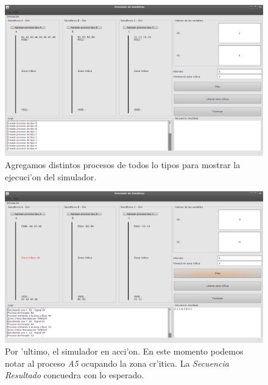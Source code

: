 \begin{figure}
\centering
 \includegraphics[scale=0.4,keepaspectratio=true]{./imagenes/semaforo/semaforos5.png}
 \caption{Agregamos distintos procesos de todos lo tipos para mostrar la ejecuci'on del simulador.}
\end{figure}

\begin{figure}
\centering
 \includegraphics[scale=0.4,keepaspectratio=true]{./imagenes/semaforo/semaforos6.png}
 \caption{Por 'ultimo, el simulador en acci'on. En este momento podemos notar al proceso \emph{A5} ocupando la zona cr'itica. La \emph{Secuencia Resultado} concuedra con lo esperado.}
\end{figure}